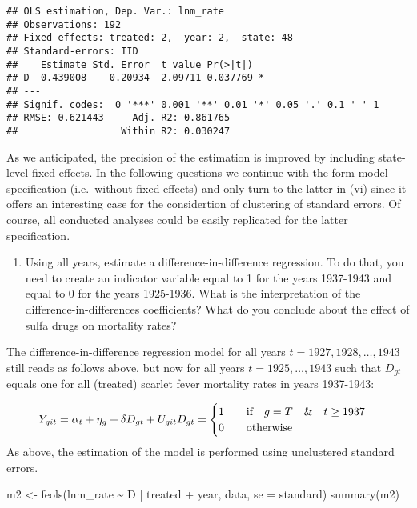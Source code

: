 \documentclass[
]{article}
\newenvironment{Shaded}{\begin{snugshade}}{\end{snugshade}}
\newcommand{\AttributeTok}[1]{\textcolor[rgb]{0.77,0.63,0.00}{#1}}
\newcommand{\FunctionTok}[1]{\textcolor[rgb]{0.00,0.00,0.00}{#1}}
\newcommand{\NormalTok}[1]{#1}
\newcommand{\OtherTok}[1]{\textcolor[rgb]{0.56,0.35,0.01}{#1}}
\newcommand{\SpecialCharTok}[1]{\textcolor[rgb]{0.00,0.00,0.00}{#1}}
\newcommand{\StringTok}[1]{\textcolor[rgb]{0.31,0.60,0.02}{#1}}
\providecommand{\tightlist}{%
  \setlength{\itemsep}{0pt}\setlength{\parskip}{0pt}}
\begin{document}
\begin{verbatim}
## OLS estimation, Dep. Var.: lnm_rate
## Observations: 192 
## Fixed-effects: treated: 2,  year: 2,  state: 48
## Standard-errors: IID 
##    Estimate Std. Error  t value Pr(>|t|)    
## D -0.439008    0.20934 -2.09711 0.037769 *  
## ---
## Signif. codes:  0 '***' 0.001 '**' 0.01 '*' 0.05 '.' 0.1 ' ' 1
## RMSE: 0.621443     Adj. R2: 0.861765
##                  Within R2: 0.030247
\end{verbatim}

As we anticipated, the precision of the estimation is improved by
including state-level fixed effects. In the following questions we
continue with the form model specification (i.e.~without fixed effects)
and only turn to the latter in (vi) since it offers an interesting case
for the considertion of clustering of standard errors. Of course, all
conducted analyses could be easily replicated for the latter
specification.

\begin{enumerate}
\def\labelenumi{\roman{enumi})}
\setcounter{enumi}{3}
\tightlist
\item
  Using all years, estimate a difference-in-difference regression. To do
  that, you need to create an indicator variable equal to 1 for the
  years 1937-1943 and equal to 0 for the years 1925-1936. What is the
  interpretation of the difference-in-differences coefficients? What do
  you conclude about the effect of sulfa drugs on mortality rates?
\end{enumerate}

The difference-in-difference regression model for all years
\(t=1927,1928,\dots,1943\) still reads as follows above, but now for all
years \(t=1925,\dots,1943\) such that \(D_{gt}\) equals one for all
(treated) scarlet fever mortality rates in years 1937-1943:

\[
Y_{git}=\alpha_t+\eta_g+\delta D_{gt}+U_{git}\\
D_{gt}=\begin{cases} 1 \qquad \text{if} \quad g=T \quad \& \quad t\geq1937 \\0 \qquad \text{otherwise} \end{cases}
\] As above, the estimation of the model is performed using unclustered
standard errors.

\begin{Shaded}
\begin{Highlighting}[]
\NormalTok{m2 }\OtherTok{\textless{}{-}} \FunctionTok{feols}\NormalTok{(lnm\_rate }\SpecialCharTok{\textasciitilde{}}\NormalTok{ D }\SpecialCharTok{|}\NormalTok{ treated }\SpecialCharTok{+}\NormalTok{ year, data,}
            \AttributeTok{se =} \StringTok{\textquotesingle{}standard\textquotesingle{}}\NormalTok{)}
\FunctionTok{summary}\NormalTok{(m2)}
\end{Highlighting}
\end{Shaded}
\end{document}
